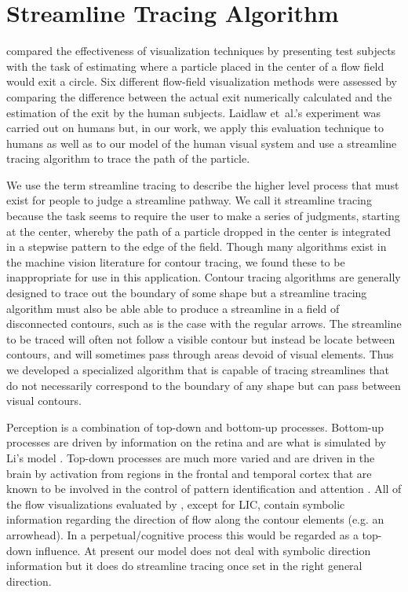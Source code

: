 \documentclass[prodmode,hillsideplop]{../acmlarge}
\begin{document}
\section{Streamline Tracing Algorithm}
 compared the effectiveness of
visualization techniques by presenting test subjects with the task of
estimating where a particle placed in the center of a flow field
would exit a circle. Six different flow-field visualization methods
were assessed by comparing the difference between the actual exit
numerically calculated and the estimation of the exit by the human
subjects. Laidlaw et~al.'s experiment was carried out on humans but,
in our work, we apply this evaluation technique to humans as well as
to our model of the human visual system and use a streamline tracing
algorithm to trace the path of the particle.

We use the term streamline tracing to describe the higher level
process that must exist for people to judge a streamline pathway.
We call it streamline tracing because the task seems to require the
user to make a series of judgments, starting at the center, whereby
the path of a particle dropped in the center is integrated in a
stepwise pattern to the edge of the field. Though many algorithms
exist in the machine vision literature for contour tracing, we found
these to be inappropriate for use in this application. Contour
tracing algorithms are generally designed to trace out the boundary
of some shape but a streamline tracing algorithm must also be able
able to produce a streamline in a field of disconnected contours,
such as is the case with the regular arrows. The streamline to be
traced will often not follow a visible contour but instead be locate
between contours, and will sometimes pass through areas devoid of
visual elements. Thus we developed a specialized algorithm that is
capable of tracing streamlines that do not necessarily correspond to
the boundary of any shape but can pass between visual contours.

Perception is a combination of top-down and bottom-up processes.
Bottom-up processes are driven by information on the retina and are
what is simulated by Li's model \citeyear{Li1998a}. Top-down
processes are much more varied and are driven in the brain by
activation from regions in the frontal and temporal cortex that are
known to be involved in the control of pattern identification and
attention \cite{Lund2001}. All of the flow visualizations evaluated
by , except for LIC, contain symbolic information
regarding the direction of flow along the contour elements (e.g. an
arrowhead). In a perpetual/cognitive process this would be regarded
as a top-down influence. At present our model does not deal with
symbolic direction information but it does do streamline tracing once
set in the right general direction.
\end{document}
